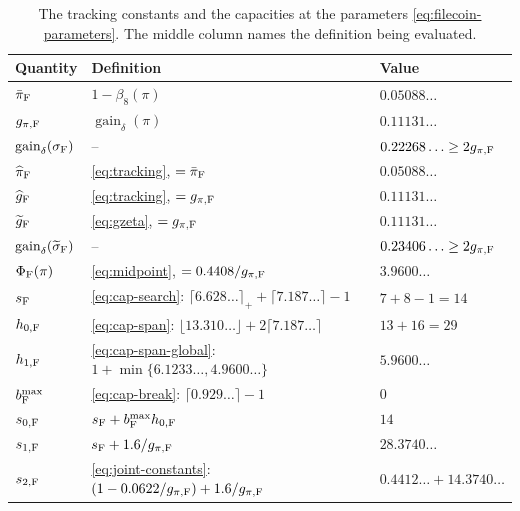 \documentclass[11pt]{article}
\theoremstyle{plain}
\theoremstyle{remark}
\newcommand{\gaind}{\operatorname{gain}_{\delta}}
\newcommand{\ghat}{\widehat g}
\newcommand{\gtilde}{\widetilde g}
\newcommand{\pihat}{\widehat{\pi}}
\newcommand{\sigmatilde}{\widetilde{\sigma}}
\newcommand{\Pot}{\Phi}
\begin{document}
\begin{table}[t]
\caption{The tracking constants and the capacities at the parameters
\eqref{eq:filecoin-parameters}.  The middle column names the definition being
evaluated.}
\label{tab:filecoin}
\begin{center}
\begin{tabular}{lll}
\toprule
Quantity & Definition & Value \\
\midrule
\(\bar\pi_{\rm F}\)          & \(1-\beta_8(\pi)\)                        & \(0.05088\ldots\) \\
\(g_{\pi,{\rm F}}\)          & \(\gaind(\pi)\)                           & \(0.11131\ldots\) \\
\(\gaind(\sigma_{\rm F})\)   & --                                        & \(0.22268\ldots\ge2g_{\pi,{\rm F}}\) \\
\(\pihat_{\rm F}\)           & \eqref{eq:tracking}, \(=\bar\pi_{\rm F}\) & \(0.05088\ldots\) \\
\(\ghat_{\rm F}\)            & \eqref{eq:tracking}, \(=g_{\pi,{\rm F}}\) & \(0.11131\ldots\) \\
\(\gtilde_{\rm F}\)          & \eqref{eq:gzeta}, \(=g_{\pi,{\rm F}}\)    & \(0.11131\ldots\) \\
\(\gaind(\sigmatilde_{\rm F})\) & --                                     & \(0.23406\ldots\ge2g_{\pi,{\rm F}}\) \\
\(\Pot_{\rm F}(\pi)\)        & \eqref{eq:midpoint}, \(=0.4408/g_{\pi,{\rm F}}\)         & \(3.9600\ldots\) \\
\midrule
\(s_{\rm F}\)                & \eqref{eq:cap-search}: \(\lceil6.628\ldots\rceil_++\lceil7.187\ldots\rceil-1\) & \(7+8-1=14\) \\
\(h_{0,{\rm F}}\)            & \eqref{eq:cap-span}: \(\lfloor13.310\ldots\rfloor+2\lceil7.187\ldots\rceil\) & \(13+16=29\) \\
\(h_{1,{\rm F}}\)            & \eqref{eq:cap-span-global}: \(1+\min\{6.1233\ldots,4.9600\ldots\}\) & \(5.9600\ldots\) \\
\(b^{\max}_{\rm F}\)         & \eqref{eq:cap-break}: \(\lceil0.929\ldots\rceil-1\)                          & \(0\) \\
\midrule
\(s_{0,{\rm F}}\)            & \(s_{\rm F}+b^{\max}_{\rm F}h_{0,{\rm F}}\)               & \(14\) \\
\(s_{1,{\rm F}}\)            & \(s_{\rm F}+1.6/g_{\pi,{\rm F}}\)                         & \(28.3740\ldots\) \\
\(s_{2,{\rm F}}\)            & \eqref{eq:joint-constants}: \((1-0.0622/g_{\pi,{\rm F}})+1.6/g_{\pi,{\rm F}}\) & \(0.4412\ldots+14.3740\ldots\) \\
\bottomrule
\end{tabular}
\end{center}
\end{table}
\end{document}
